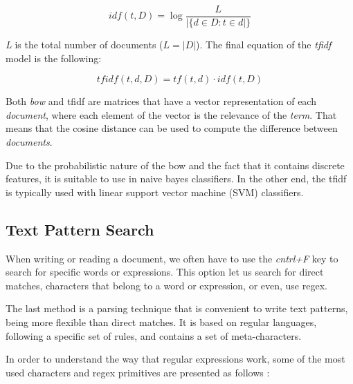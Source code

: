 \begin{equation}
\label{eq:idf}
    idf(t, D) = \log{\frac{L}{|\{d \in D: t \in d|\}}}
\end{equation}

\textit{L} is the total number of documents ($L = |D|$). The final equation of the \textit{tfidf} model is the following:

\begin{equation}
\label{eq:tfidf}
    tfidf(t, d, D) = tf(t, d) \cdot idf(t, D) 
\end{equation}

Both \textit{bow} and \gls{tfidf} are matrices that have a vector representation of each \textit{document}, where each element of the vector is the relevance of the \textit{term}. That means that the cosine distance can be used to compute the difference between \textit{documents}.
\par
Due to the probabilistic nature of the \gls{bow} and the fact that it contains discrete features, it is suitable to use in naive bayes classifiers. In the other end, the \gls{tfidf} is typically used with linear support vector machine (SVM) classifiers.

\subsection{Text Pattern Search}

When writing or reading a document, we often have to use the \textit{cntrl+F} key to search for specific words or expressions. This option let us search for direct matches, characters that belong to a word or expression, or even, use \gls{regex}.
\par
The last method is a parsing technique that is convenient to write text patterns, being more flexible than direct matches. It is based on regular languages, following a specific set of rules, and contains a set of meta-characters.
\par
In order to understand the way that regular expressions work, some of the most used characters and \gls{regex} primitives are presented as follows \cite{regex2}:

